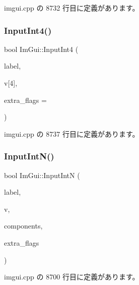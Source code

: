  imgui.\+cpp の 8732 行目に定義があります。

\mbox{\label{namespace_im_gui_ac714ecf202c82dc6caa0cbf344c85a13}} 
\subsubsection{\texorpdfstring{Input\+Int4()}{InputInt4()}}
{\footnotesize\ttfamily bool Im\+Gui\+::\+Input\+Int4 (\begin{DoxyParamCaption}\item[{const char $\ast$}]{label,  }\item[{int}]{v\mbox{[}4\mbox{]},  }\item[{\mbox{\hyperlink{imgui_8h_a7d2c6153a6b9b5d3178ce82434ac9fb8}{Im\+Gui\+Input\+Text\+Flags}}}]{extra\+\_\+flags = {} }\end{DoxyParamCaption})}



 imgui.\+cpp の 8737 行目に定義があります。

\mbox{\label{namespace_im_gui_a9b9aaec8d095156b74ee191b532fa137}} 
\subsubsection{\texorpdfstring{Input\+Int\+N()}{InputIntN()}}
{\footnotesize\ttfamily bool Im\+Gui\+::\+Input\+IntN (\begin{DoxyParamCaption}\item[{const char $\ast$}]{label,  }\item[{int $\ast$}]{v,  }\item[{int}]{components,  }\item[{\mbox{\hyperlink{imgui_8h_a7d2c6153a6b9b5d3178ce82434ac9fb8}{Im\+Gui\+Input\+Text\+Flags}}}]{extra\+\_\+flags }\end{DoxyParamCaption})}



 imgui.\+cpp の 8700 行目に定義があります。

\mbox{\label{namespace_im_gui_a9b7223f54687d740a5961d7f278e01ef}} 
